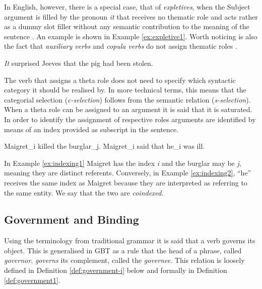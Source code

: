     In English, however, there is a special case, that of \textit{expletives}, when the Subject argument is filled by the pronoun \textit{it} that receives no thematic role and acts rather as a dummy slot filler without any semantic contribution to the meaning of the sentence \citep[62]{Haegeman1991}. An example is shown in Example \ref{ex:expletive1}. Worth noticing is also the fact that \textit{auxiliary verbs} and \textit{copula verbs} do not assign thematic roles \citep{pollock1989verb}. 
    
    \begin{exe}
        \ex\label{ex:expletive1} \textit{It} surprised Jeeves that the pig had been stolen.
    \end{exe}

    The verb that assigns a theta role does not need to specify which syntactic category it should be realised by. In more technical terms, this means that the categorial selection (\textit{c-selection}) follows from the semantic relation (\textit{s-selection}). When a theta role can be assigned to an argument it is said that it is saturated. In order to identify the assignment of respective roles arguments are identified by means of an index provided as subscript in the sentence.

    \begin{exe}
        \ex\label{ex:indexing1} Maigret_i killed the burglar_j.
        \ex\label{ex:indexing2} Maigret_i said that he_i was ill.
    \end{exe}

    In Example \ref{ex:indexing1} Maigret has the index \textit{i} and the burglar may be \textit{j}, meaning they are distinct referents. Conversely, in Example \ref{ex:indexing2}, ``he'' receives the same index as Maigret because they are interpreted as referring to the same entity. We say that the two are \textit{coindexed}.

\subsection{Government and Binding}

    Using the terminology from traditional grammar it is said that a verb governs its object. This is generalised in GBT as a rule that the head of a phrase, called \textit{governor}, \textit{governs} its complement, called the \textit{governee}. This relation is loosely defined in Definition \ref{def:government-i} below and formally in Definition \ref{def:government1}. 

